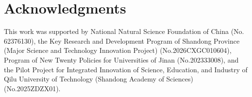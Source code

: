 \documentclass[manuscript,review]{acmart}
\begin{document}
\section*{Acknowledgments}
This work was supported by National Natural Science Foundation of China (No. 62376130),  the Key Research and Development Program of Shandong Province (Major Science and Technology Innovation Project) (No.2026CXGC010604), Program of New Twenty Policies for Universities of Jinan (No.202333008), and the Pilot Project for Integrated Innovation of Science, Education, and Industry of Qilu University of Technology (Shandong Academy of Sciences) (No.2025ZDZX01).





\end{document}
